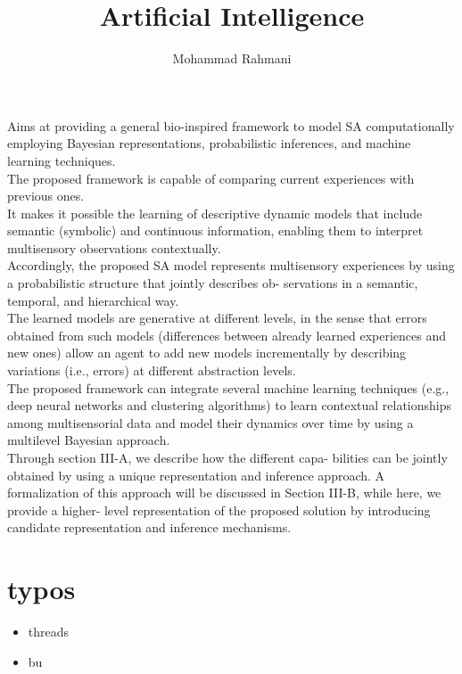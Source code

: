 \documentclass{article}
\begin{document}
	
	\title{Artificial Intelligence}
	\author{Mohammad Rahmani}
	\date{}
	\maketitle
	Aims at providing a general bio-inspired framework to model SA computationally employing Bayesian
	representations, probabilistic inferences, and machine learning techniques.
	\\
	The proposed framework is capable of comparing
	current experiences with previous ones. 
	\\ 
	It makes it possible the
	learning of descriptive dynamic models that include semantic
	(symbolic) and continuous information, enabling them to
	interpret multisensory observations contextually.
	\\
	Accordingly,
	the proposed SA model represents multisensory experiences
	by using a probabilistic structure that jointly describes ob-
	servations in a semantic, temporal, and hierarchical way.
	\\
	The
	learned models are generative at different levels, in the sense
	that errors obtained from such models (differences between
	already learned experiences and new ones) allow an agent to
	add new models incrementally by describing variations (i.e.,
	errors) at different abstraction levels.
	\\
	 The proposed framework
	can integrate several machine learning techniques (e.g., deep
	neural networks and clustering algorithms) to learn contextual relationships among multisensorial data and model their
	dynamics over time by using a multilevel Bayesian approach.
	\\
	Through section III-A, we describe how the different capa-
	bilities can be jointly obtained by using a unique representation
	and inference approach. A formalization of this approach will
	be discussed in Section III-B, while here, we provide a higher-
	level representation of the proposed solution by introducing
	candidate representation and inference mechanisms.
	
	\section{typos}
		\begin{itemize}
			\item threads
			\item bu
		\end{itemize}
	
\end{document}
